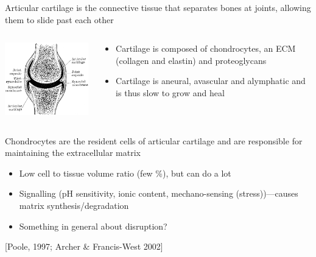 \documentclass[ignorenonframetext]{beamer}
\newcommand{\references}[1] {
  \begin{flushright}
    \scriptsize [#1] \normalsize
  \end{flushright}
}
\begin{document}
\begin{frame}
\begin{columns}
\begin{column}{5cm}
    \end{column}
  \end{columns}
\end{frame}


\begin{frame}{Articular cartilage is the connective tissue that
    separates bones at joints, allowing them to slide past each other}

  \begin{columns}

    \begin{column}{6cm}
      \includegraphics[width=6cm]{../images/pdf/joint}
    \end{column}

    \begin{column}{6cm}
      \begin{itemize}
      \item<1-> Cartilage is composed of chondrocytes, an ECM (collagen
        and elastin) and proteoglycans\\[0.5cm]
        \pause
      \item<2-> Cartilage is aneural, avascular and alymphatic and is thus
        slow to grow and heal %
      \end{itemize}
    \end{column}

  \end{columns}

\end{frame}

\begin{frame}{Chondrocytes are the resident cells of articular
    cartilage and are responsible for maintaining the extracellular
    matrix}

  \begin{itemize}
  \item Low cell to tissue volume ratio (few \%), but can do a lot
  \item Signalling (pH sensitivity, ionic content, mechano-sensing
    (stress))---causes matrix synthesis/degradation
  \item Something in general about disruption?
  \end{itemize}

  \references{Poole, 1997; Archer \& Francis-West 2002}

\end{frame}
\end{document}
